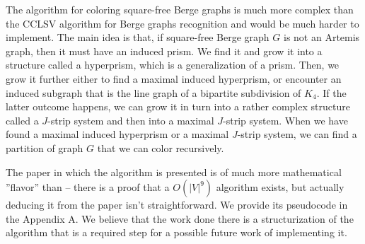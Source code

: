 The algorithm for coloring square-free Berge graphs is much more complex than the CCLSV algorithm for Berge graphs recognition and would be much harder to implement.  
The main idea is that, if square-free Berge graph $G$ is not an Artemis graph, then it must have an induced prism. We find it and grow it into a structure called a hyperprism, which is a generalization of a prism. Then, we grow it further either to find a maximal induced hyperprism, or encounter an induced subgraph that is the line graph of a bipartite subdivision of $K_4$. If the latter outcome happens, we can grow it in turn into a rather complex structure called a $J$-strip system and then into a maximal $J$-strip system. When we have found a maximal induced hyperprism or a maximal $J$-strip system, we can find a partition of graph $G$ that we can color recursively. 

The paper in which the algorithm is presented \cite{coloringSquareFree} is of much more mathematical ''flavor'' than \cite{MC05} -- there is a proof that a $O(|V|^9)$ algorithm exists, but actually deducing it from the paper isn't straightforward. We provide its pseudocode in the Appendix A. We believe that the work done there is a structurization of the algorithm that is a required step for a possible future work of implementing it.